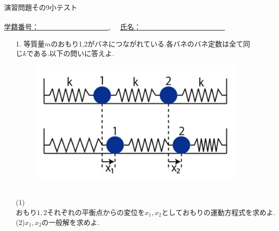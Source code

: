 \documentclass[11pt]{jarticle}
\begin{document}
\begin{center}
{\Large
演習問題その9小テスト}\\
\ \\
\underline{学籍番号：　　　　　　　　　　},　
\underline{氏名：　　　　　　　　　　　　}
\end{center}
\begin{enumerate}
\item[1.]
等質量$m$のおもり1,2がバネにつながれている.各バネのバネ定数は全て同じ$k$である.以下の問いに答えよ.\\
\begin{figure}[htpb]
\begin{center}
\includegraphics[scale=.20]{bane.png}
\end{center}
\end{figure}
\\
(1)$おもり1,2それぞれの平衡点からの変位をx_1,x_2としておもりの運動方程式を求めよ.$\\
(2)$x_1,x_2の一般解を求めよ.$


\end{enumerate}
\end{document}
